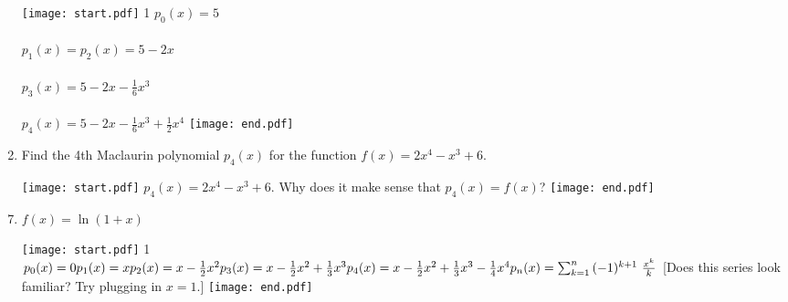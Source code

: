 \documentclass[12pt]{article}
\begin{document}
\begin{enumerate}
\texttt{[image: start.pdf]}
{{{1\linewidth}{
$p_0(x)=5$ \\ \\ 
$p_1(x)=p_2(x)=5-2x$ \\ \\
$p_3(x)=5-2x-\frac{1}{6}x^3$ \\ \\
$p_4(x)=5-2x-\frac{1}{6}x^3+\frac{1}{2}x^4$ }}}
\texttt{[image: end.pdf]}


\item Find the 4th Maclaurin polynomial $p_4(x)$ for the function $f(x)=2x^4-x^3+6$.

\texttt{[image: start.pdf]}
{{$p_4(x)=2x^4-x^3+6$.  Why does it make sense that $p_4(x)=f(x)$?}}
\texttt{[image: end.pdf]}



\end{enumerate}

\begin{enumerate}
\setcounter{enumi}{6}

\item $f(x)=\ln(1+x)$

\texttt{[image: start.pdf]}
{{{1\linewidth}{$p_0(x)=0 \\ \\ p_1(x)=x \\ \\ p_2(x)=x-\frac{1}{2}x^2 \\ \\ p_3(x)=x-\frac{1}{2}x^2+\frac{1}{3}x^3 
\\ \\ p_4(x)=x-\frac{1}{2}x^2+\frac{1}{3}x^3-\frac{1}{4}x^4 
\\ \\ p_n(x)=\sum_{k=1}^{n}{(-1)^{k+1} \text{ } \frac{x^k}{k}}$ [Does this series look familiar?  Try plugging in $x=1$.] }}}
\texttt{[image: end.pdf]}


\end{enumerate}
\end{document}
